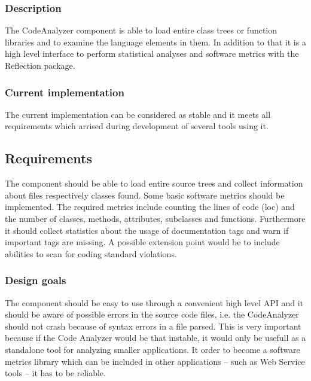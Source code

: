 \documentclass[10pt,final,a4paper,oneside]{article}
\begin{document}
\subsubsection{Description}
The CodeAnalyzer component is able to load entire class trees
or function libraries
and to examine the language elements in them.
In addition to that it is a high level interface to
perform statistical analyses and software metrics with
the Reflection package.

\subsubsection{Current implementation}
The current implementation can be considered as stable
and it meets all requirements which arrised during
development of several tools using it.

\subsection{Requirements}\label{subsec:CodeAnalyzerRequirements}
The component should be able to load entire source trees
and collect information about files respectively classes found.
Some basic software metrics should be implemented.
The required metrics include
counting the lines of code (loc) and the number of
classes, methods, attributes, subclasses and functions.
Furthermore it should collect statistics
about the usage of documentation tags
and warn if important tags are missing.
A possible extension point would be to include abilities
to scan for coding standard violations.

\subsubsection{Design goals}
The component should be easy to use through a convenient high level API
and it should be aware of possible errors in the source code files, i.e.
the CodeAnalyzer should not crash because of syntax errors in a file parsed.
This is very important because if the Code Analyzer would be that instable,
it would only be usefull as a standalone tool for analyzing
smaller applications. It order to become a software metrics library
which can be included in other applications -- such as Web Service tools --
it has to be reliable.


\end{document}
